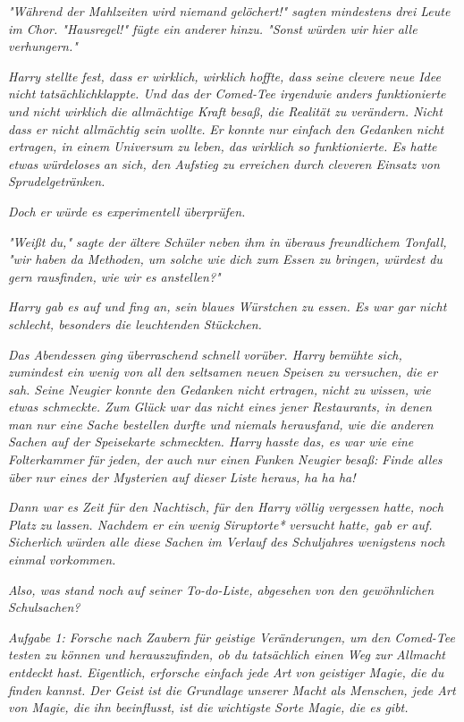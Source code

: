 {\emph{"Während der Mahlzeiten wird niemand gelöchert!" sagten mindestens drei Leute im Chor. "Hausregel!" fügte ein anderer hinzu. "Sonst würden wir hier alle verhungern."}

\emph{Harry stellte fest, dass er wirklich, wirklich hoffte, dass seine clevere neue Idee nicht} \emph{\emph{tatsächlich}klappte. Und das der Comed-Tee irgendwie anders funktionierte und nicht} \emph{\emph{wirklich}} \emph{die allmächtige Kraft besaß, die Realität zu verändern. Nicht dass er nicht allmächtig sein} \emph{\emph{wollte.}} \emph{Er konnte nur} \emph{einfach den Gedanken nicht ertragen, in einem Universum zu leben, das wirklich so funktionierte. Es hatte etwas} \emph{\emph{würdeloses}} \emph{an sich, den Aufstieg zu erreichen durch cleveren Einsatz von Sprudelgetränken.}

\emph{Doch er} \emph{\emph{würde}} \emph{es experimentell überprüfen.}

\emph{"Weißt du," sagte der ältere Schüler neben ihm in überaus freundlichem Tonfall, "wir haben da Methoden, um solche wie dich zum Essen zu bringen, würdest du gern rausfinden, wie wir es anstellen?"}

\emph{Harry gab es auf und fing an, sein blaues Würstchen zu essen. Es war gar nicht schlecht, besonders die leuchtenden Stückchen.}

\emph{Das Abendessen ging überraschend schnell vorüber. Harry} \emph{bemühte sich, zumindest ein wenig von all den seltsamen neuen Speisen zu versuchen, die er sah. Seine Neugier konnte den Gedanken nicht ertragen,} \emph{\emph{nicht zu wissen,}} \emph{wie etwas schmeckte. Zum Glück war das nicht eines jener Restaurants, in denen man nur eine Sache bestellen durfte und niemals herausfand, wie die anderen Sachen auf der Speisekarte schmeckten. Harry} \emph{\emph{hasste}} \emph{das, es war wie eine Folterkammer für} \emph{jeden, der auch nur einen Funken Neugier besaß:} \emph{\emph{Finde alles über nur eines der Mysterien auf dieser Liste heraus, ha ha ha!}}

\emph{Dann war es Zeit für den Nachtisch, für den Harry völlig vergessen hatte, noch Platz zu lassen. Nachdem er ein wenig} \emph{Siruptorte*} \emph{versucht hatte, gab er auf. Sicherlich würden alle diese Sachen im Verlauf des Schuljahres wenigstens noch einmal vorkommen.}

\emph{Also, was stand noch auf seiner To-do-Liste, abgesehen von den gewöhnlichen Schulsachen?}

\emph{\emph{Aufgabe 1: Forsche nach Zaubern für geistige Veränderungen, um den Comed-Tee testen zu können und herauszufinden, ob du tatsächlich einen Weg zur Allmacht entdeckt hast. Eigentlich, erforsche einfach jede Art von geistiger Magie, die du finden kannst. Der Geist ist die Grundlage unserer Macht als Menschen, jede Art von Magie, die ihn beeinflusst, ist die wichtigste Sorte Magie, die es gibt.}}

}
